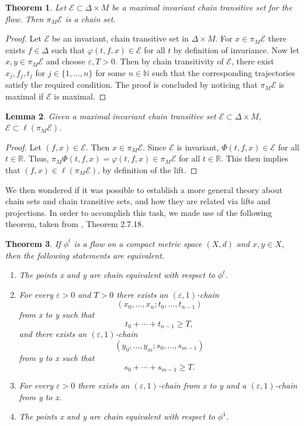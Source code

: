 \documentclass[11pt]{article}
\newtheorem{thm}{Theorem}
\newtheorem{lem}[thm]{Lemma}
\begin{document}
\begin{thm}\label{max chain set}
Let $\mathcal{E}\subset \Delta\times M$ be a maximal invariant chain transitive set for the flow.  Then $\pi_M\mathcal{E}$ is a chain set.
\end{thm}
\begin{proof}
Let $\mathcal{E}$ be an invariant, chain transitive set in $\Delta\times M$.  For $x\in\pi_M\mathcal{E}$ there exists $f\in\Delta$ such that $\varphi(t,f,x)\in\mathcal{E}$ for all $t$ by definition of invariance.  Now let $x,y\in \pi_M\mathcal{E}$ and choose $\varepsilon, T>0$.  Then by chain transitivity of $\mathcal{E}$, there exist $x_j, f_j, t_j$ for $j\in\{1,\ldots,n\}$ for some $n\in\mathbb{N}$ such that the corresponding trajectories satisfy the required condition.  The proof is concluded by noticing that $\pi_M\mathcal{E}$ is maximal if $\mathcal{E}$ is maximal.

\end{proof}

\begin{lem}\label{chain set subset}
Given a maximal invariant chain transitive set $\mathcal{E}\subset \Delta\times M$, $\mathcal{E}\subset\ell(\pi_M\mathcal{E})$.
\end{lem}
\begin{proof}
Let $(f,x)\in\mathcal{E}$.  Then $x\in \pi_M\mathcal{E}$.  Since $\mathcal{E}$ is invariant, $\Phi(t,f,x)\in \mathcal{E}$ for all $t\in\mathbb{R}$.  Thus, $\pi_M\Phi(t,f,x)=\varphi(t,f,x)\in\pi_M\mathcal{E}$ for all $t\in\mathbb{R}$.  This then implies that $(f,x)\in\ell(\pi_M\mathcal{E})$, by definition of the lift. 
\end{proof}


We then wondered if it was possible to establish a more general theory about chain sets and chain transitive sets, and how they are related via lifts and projections.  In order to accomplish this task, we made use of the following theorem, taken from \cite{Alongi}, Theorem 2.7.18.


\begin{thm}\label{h flow}
If $\phi^t$ is a flow on a compact metric space $(X,d)$ and $x,y\in X$, then the following statements are equivalent.
\begin{enumerate}
\item The points x and y are chain equivalent with respect to $\phi^t$.
\item For every $\varepsilon>0$ and $T>0$ there exists an $(\varepsilon,1)$-chain
$$(x_0,\ldots,x_n;t_0,\ldots,t_{n-1})$$
from x to y such that 
$$t_0+\cdots+t_{n-1}\geq T,$$
and there exists an $(\varepsilon,1)$-chain 
$$(y_0,\ldots,y_m;s_0,\ldots,s_{m-1})$$
from y to x such that
$$s_0+\cdots+s_{m-1}\geq T.$$
\item For every $\varepsilon>0$ there exists an $(\varepsilon,1)$-chain from x to y and a $(\varepsilon,1)$-chain from y to x.
\item The points x and y are chain equivalent with respect to $\phi^1$.
\end{enumerate}
\end{thm}
\end{document}
